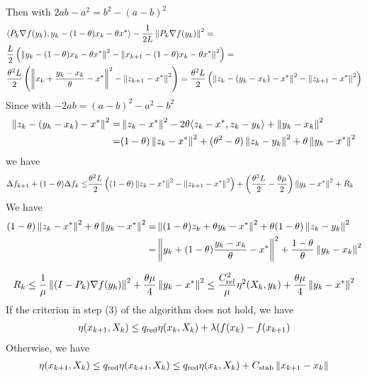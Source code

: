 \documentclass[12pt,english]{article}
\begin{document}
Then with $2ab-a^2=b^2-(a-b)^2$
%
\begin{align*}
&\langle P_k\nabla f(y_k),y_k-(1-\theta) x_k -\theta x^*\rangle-\frac{1}{2L}\left\|P_k\nabla f(y_k)\right\|^2=\\
&\frac{L}{2}\left(\left\|y_k-(1-\theta) x_k -\theta x^*\right\|^2-\left\|x_{k+1}-(1-\theta) x_k -\theta x^*\right\|^2\right)=\\
&\frac{\theta^2L}{2}\left(\left\|x_k+\frac{y_k-x_k}{\theta} - x^*\right\|^2-\left\|z_{k+1}- x^*\right\|^2\right)=
\frac{\theta^2L}{2}\left(\left\|z_k -(y_k-x_k) - x^*\right\|^2-\left\|z_{k+1}- x^*\right\|^2\right)
\end{align*}
%
Since with $-2ab= (a-b)^2-a^2-b^2$
%
\begin{align*}
\left\|z_k -(y_k-x_k) - x^*\right\|^2 =& \left\|z_k - x^*\right\|^2 - 2\theta\langle z_k -x^*,z_k-y_k\rangle + \left\|y_k-x_k\right\|^2\\
=& (1-\theta) \left\|z_k - x^*\right\|^2 + (\theta^2-\theta)\left\|z_k-y_k\right\|^2 + \theta \left\|y_k-x^*\right\|^2
\end{align*}
%
we have
%
%
\begin{align*}
\Delta f_{k+1} + (1-\theta)\Delta f_k \le& \frac{\theta^2L}{2}\left((1-\theta)\left\|z_k - x^*\right\|^2-\left\|z_{k+1}- x^*\right\|^2\right)
+ \left(\frac{\theta^3L}{2}-\frac{\theta\mu}{2}\right)\left\|y_k-x^*\right\|^2 + R_k
\end{align*}
%
We have
%
\begin{align*}
(1-\theta)\left\|z_k - x^*\right\|^2 + \theta \left\|y_k-x^*\right\|^2 =& \left\|(1-\theta)z_k+\theta y_k - x^*\right\|^2 + \theta(1-\theta)\left\|z_k -y_k\right\|^2\\
=& \left\|y_k  + (1-\theta)\frac{y_k-x_{k}}{\theta} - x^*\right\|^2 + \frac{1-\theta}{\theta}\left\|y_k -x_k\right\|^2
\end{align*}
%

%
\begin{align*}
R_k \le \frac{1}{\mu}\left\|(I-P_k)\nabla f(y_k)\right\|^2 + \frac{\theta\mu}{4}\left\|y_k-x^*\right\|^2
\le  \frac{C_{\rm rel}^2}{\mu}\eta^2(X_k,y_k)  + \frac{\theta\mu}{4}\left\|y_k-x^*\right\|^2
\end{align*}
%
If the criterion in step (3) of the algorithm does not hold, we have
%
\begin{align*}
\eta(x_{k+1},X_k) \le q_{\rm red} \eta(x_{k},X_k) + \lambda(f(x_k)-f(x_{k+1})
\end{align*}
%
Otherwise, we have
%
\begin{align*}
\eta(x_{k+1},X_k) \le q_{\rm red} \eta(x_{k+1},X_k)\le q_{\rm red} \eta(x_{k},X_k)+ C_{\rm stab}\left\|x_{k+1}-x_{k}\right\|
\end{align*}
%

%




\printbibliography
%
\end{document}
